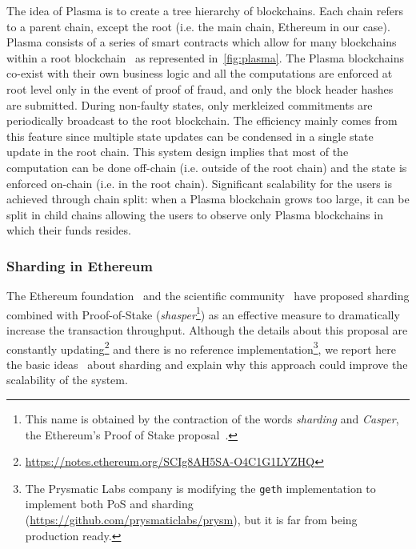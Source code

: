 The idea of Plasma is to create a tree hierarchy of blockchains. Each chain
refers to a parent chain, except the root (i.e. the main chain, Ethereum in our
case). Plasma consists of a series of smart contracts which allow for many
blockchains within a root blockchain~\cite{poon2017plasma} as represented
in~\autoref{fig:plasma}. The Plasma blockchains co-exist with their own business
logic and all the computations are enforced at root level only in the event of
proof of fraud, and only the block header hashes are submitted. During
non-faulty states, only merkleized commitments are periodically broadcast to the
root blockchain. The efficiency mainly comes from this feature since multiple
state updates can be condensed in a single state update in the root chain. This
system design implies that most of the computation can be done off-chain (i.e.
outside of the root chain) and the state is enforced on-chain (i.e. in the root
chain). Significant scalability for the users is achieved through chain split:
when a Plasma blockchain grows too large, it can be split in child chains
allowing the users to observe only Plasma blockchains in which their funds
resides.

\subsubsection{Sharding in Ethereum}
\label{sec:sharding-ethereum}
The Ethereum foundation~\cite{bib:mauve, bib:sharding-faq} and the scientific
community~\cite{bib:scaling-croman} have proposed sharding combined with
Proof-of-Stake (\emph{shasper}\footnote{This name is obtained by the contraction
of the words \emph{sharding} and \emph{Casper}, the Ethereum's Proof of Stake
proposal~\cite{bib:cbc-casper}.}) as an effective measure to dramatically
increase the transaction throughput. Although the details about this proposal
are constantly
updating\footnote{\url{https://notes.ethereum.org/SCIg8AH5SA-O4C1G1LYZHQ}} and
there is no reference implementation\footnote{The Prysmatic Labs company is
modifying the \texttt{geth} implementation to implement both PoS and sharding
(\url{https://github.com/prysmaticlabs/prysm}), but it is far from being
production ready.}, we report here the basic
ideas~\cite{bib:mauve,bib:sharding-faq} about sharding and explain why this
approach could improve the scalability of the system.

